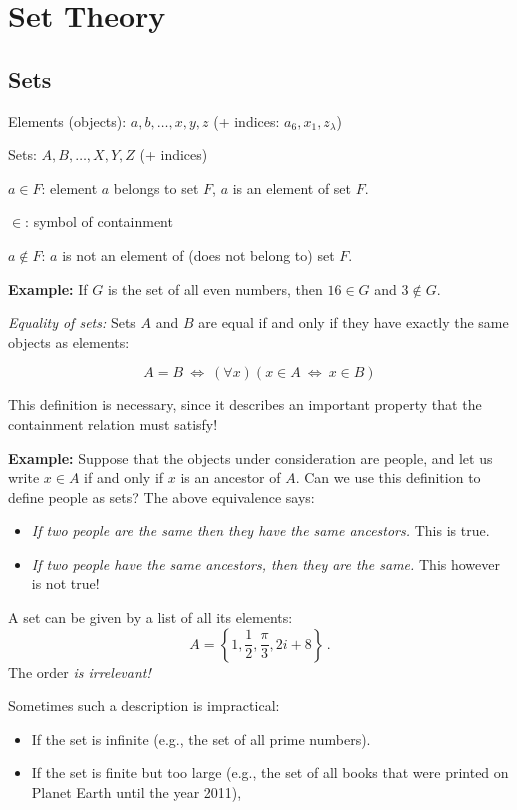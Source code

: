 \documentclass[11pt,paper=b5,footinclude,headinclude]{scrbook} %
\def\cee {{~\Leftrightarrow~}}
\theoremstyle{remark}
\theoremstyle{definition} %
\theoremstyle{theorem} %
\begin{document}
\chapter{Set Theory}

\section{Sets}

Elements (objects): $a,b,\ldots, x,y,z$ (+ indices: $a_6, x_1, z_\lambda$)

Sets: $A,B,\ldots, X,Y,Z$ (+ indices)

$a\in F$: element $a$ belongs to set $F$, $a$ is an element of set $F$.

$\in$: symbol of containment

$a\not\in F$: $a$ is not an element of (does not belong to) set $F$.

\textbf{ Example:}
If $G$ is the set of all even numbers, then $16\in G$ and $3\not\in G$.


\medskip
{\em Equality of sets:} Sets $A$ and $B$ are equal if and only if they have exactly the same objects as elements:

$$A = B \cee (\forall x) (x\in A\cee x\in B)$$

\medskip
This definition is necessary, since it describes an important property that the containment relation must satisfy!

\medskip

\textbf{ Example:} Suppose that the objects under consideration are people, and
let us write $x\in A$ if and only if $x$ is an ancestor of  $A$.
Can we use this definition to define people as sets?
The above equivalence says:
\begin{itemize}
  \item {\em If two people are the same then they have the same ancestors.} This is true.
  \item {\em If two people have the same ancestors, then they are the same.} This however is not true!
\end{itemize}

\bigskip
A set can be given by a list of all its elements:
$$A = \left\{1,\frac{1}{2}, \frac{\pi}{3}, 2i+8\right\}\,.$$
The order {\em is irrelevant!}

\medskip
Sometimes such a description is impractical:
\begin{itemize}
  \item If the set is infinite (e.g., the set of all prime numbers).
  \item If the set is finite but too large (e.g., the set of all books that were printed on Planet Earth until the year 2011),
\end{itemize}
\end{document}
